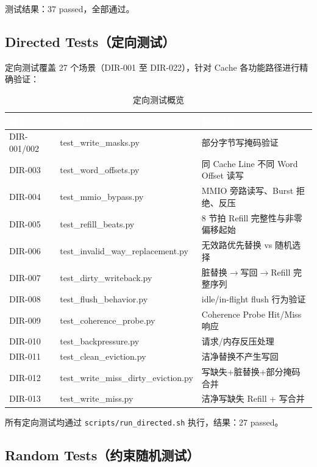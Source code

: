 \documentclass[12pt,a4paper]{ctexart}
\newcommand{\thcell}[1]{\textcolor{white}{\bfseries #1}}
\begin{document}
测试结果：37 passed，全部通过。

\subsection{Directed Tests（定向测试）}

定向测试覆盖 27 个场景（DIR-001 至 DIR-022），针对 Cache 各功能路径进行精确验证：

\begin{table}[H]
\centering
\caption{定向测试概览}
\small
\renewcommand{\arraystretch}{1.2}
\begin{tabular}{@{}p{3.2cm}p{4.8cm}p{4.5cm}@{}}
\toprule
\rowcolor{primaryblue}
\thcell{编号} & \thcell{测试文件} & \thcell{验证目标} \\
\midrule
\rowcolor{rowgray} DIR-001/002 & test\_write\_masks.py & 部分字节写掩码验证 \\
DIR-003 & test\_word\_offsets.py & 同 Cache Line 不同 Word Offset 读写 \\
\rowcolor{rowgray} DIR-004 & test\_mmio\_bypass.py & MMIO 旁路读写、Burst 拒绝、反压 \\
DIR-005 & test\_refill\_beats.py & 8 节拍 Refill 完整性与非零偏移起始 \\
\rowcolor{rowgray} DIR-006 & test\_invalid\_way\_replacement.py & 无效路优先替换 vs 随机选择 \\
DIR-007 & test\_dirty\_writeback.py & 脏替换$\rightarrow$写回$\rightarrow$Refill 完整序列 \\
\rowcolor{rowgray} DIR-008 & test\_flush\_behavior.py & idle/in-flight flush 行为验证 \\
DIR-009 & test\_coherence\_probe.py & Coherence Probe Hit/Miss 响应 \\
\rowcolor{rowgray} DIR-010 & test\_backpressure.py & 请求/内存反压处理 \\
DIR-011 & test\_clean\_eviction.py & 洁净替换不产生写回 \\
\rowcolor{rowgray} DIR-012 & test\_write\_miss\_dirty\_eviction.py & 写缺失+脏替换+部分掩码合并 \\
DIR-013 & test\_write\_miss.py & 洁净写缺失 Refill + 写合并 \\
\bottomrule
\end{tabular}
\end{table}

所有定向测试均通过 \lstinline{scripts/run_directed.sh} 执行，结果：27 passed。

\subsection{Random Tests（约束随机测试）}
\end{document}
